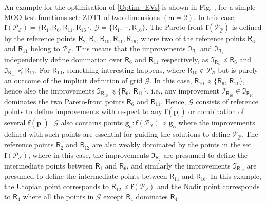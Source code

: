  An example for the optimisation of \eqref{Optim_EVs} is shown in Fig. , for a simple MOO test functions set: ZDT1 of two dimensions $(\mathsf{m}=2)$. 
 In this case, $\bm f(\mathscr{P}_{\mathcal{S}})=\{\bm{\mathsf{R}}_1, \bm{\mathsf{R}}_6, \bm{\mathsf{R}}_{11}, \bm{\mathsf{R}}_{16}\}$, $\mathscr{G}=\{\bm{\mathsf{R}}_1,\cdots,\bm{\mathsf{R}}_{16}\}$.
The Pareto front  $\bm f(\mathscr{P}_{\hat{\mathcal{S}}})$ is defined by the reference points $\bm{\mathsf{R}}_{2},\bm{\mathsf{R}}_{6},\bm{\mathsf{R}}_{10},\bm{\mathsf{R}}_{11},\bm{\mathsf{R}}_{16}$, where two of the reference points $\bm{\mathsf{R}}_6$ and $\bm{\mathsf{R}}_{11}$ belong to $\mathscr{P}_{\mathcal{S}}$. This means that the improvements $\mathfrak{I}_{\bm{\mathsf{R}}_6}$ and $\mathfrak{I}_{\bm{\mathsf{R}}_{11}}$ independently define domination over $\bm{\mathsf{R}}_6$ and $\bm{\mathsf{R}}_{11}$ respectively, as $\mathfrak{I}_{\bm{\mathsf{R}}_6} \preceq \bm{\mathsf{R}}_6$ and $\mathfrak{I}_{\bm{\mathsf{R}}_{11}} \preceq \bm{\mathsf{R}}_{11}$.
For $\bm{\mathsf{R}}_{10}$, something interesting happens, where $\bm{\mathsf{R}}_{10} \notin \mathscr{P}_{\mathcal{S}}$ but is purely an outcome of the implicit definition of grid $\mathscr{G}$. In this case, $\bm{\mathsf{R}}_{10} \preceq \{\bm{\mathsf{R}}_6$,  $\bm{\mathsf{R}}_{11}\}$, hence also the improvements $\mathfrak{I}_{\bm{\mathsf{R}}_{10}} \preceq \{\bm{\mathsf{R}}_6$,  $\bm{\mathsf{R}}_{11}\}$, i.e., any improvement $\mathscr{I}_{\bm{\mathsf{R}}_{10}} \in \mathfrak{I}_{\bm{\mathsf{R}}_{10}}$ dominates the two Pareto-front points $\bm{\mathsf{R}}_6$ and $\bm{\mathsf{R}}_{11}$. 
Hence, $\mathscr{G}$ consists of reference points to define improvements with respect to any $\bm f (\bm p_{\mathrm i})$ or combination of several $\bm f (\bm p_{\mathrm i})$. $\mathscr{G}$ also contains points $\bm g_{\mathsf{o}}: \bm f(\mathscr{P}_{\mathcal{S}})\preceq \bm g_{\mathsf{o}}$ where the improvements defined with such points are essential for guiding the solutions to define $\mathscr{P}_{\hat{\mathcal{S}}}$. The reference points $\bm{\mathsf{R}}_2$ and $\bm{\mathsf{R}}_{12}$ are also weakly dominated by the points in the set $\bm f(\mathscr{P}_{\mathcal{S}})$, where in this case, the improvements $\mathfrak{I}_{\bm{\mathsf{R}}_2}$ are presumed to define the intermediate points between ${\bm{\mathsf{R}}_1}$ and ${\bm{\mathsf{R}}_6}$, and similarly the improvements $\mathfrak{I}_{\bm{\mathsf{R}}_{12}}$ are presumed to define the intermediate points between ${\bm{\mathsf{R}}_{11}}$ and ${\bm{\mathsf{R}}_{16}}$.
In this example, the Utopian point corresponds to ${\bm{\mathsf{R}}_{12}} \preceq \bm f(\mathscr{P}_{\mathcal{S}})$ and the Nadir point corresponds to  ${\bm{\mathsf{R}}_4}$ where all the points in $\mathscr{G}$ except ${\bm{\mathsf{R}}_4}$ dominates ${\bm{\mathsf{R}}_4}$. \\


